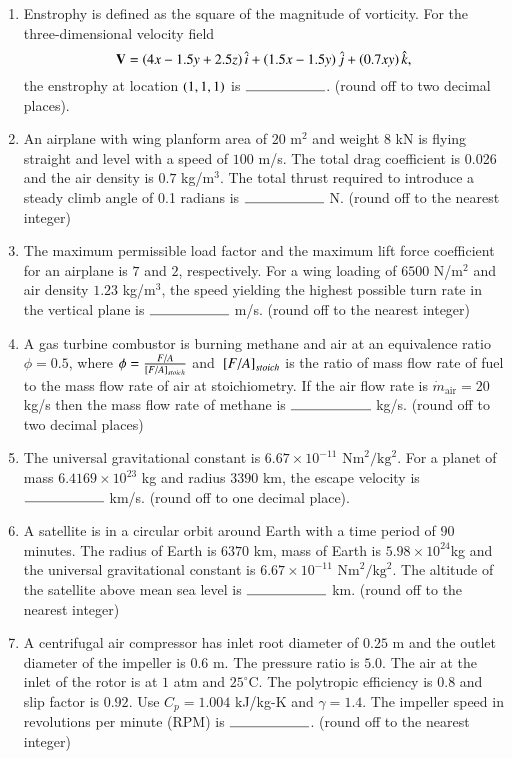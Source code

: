 \documentclass[journal,12pt,onecolumn]{IEEEtran}
\theoremstyle{remark}
\begin{document}
\begin{enumerate}[start=53]
	\item Enstrophy is defined as the square of the magnitude of vorticity. For the three-dimensional velocity field $$ \mathbf{V} = \left(4x - 1.5y + 2.5z\right)\hat{i} + \left(1.5x - 1.5y\right)\hat{j} + \left(0.7xy\right) \hat{k},$$ the enstrophy at location $\left(1, 1, 1\right)$ is $\rule{2cm}{0.4pt}$. (round off to two decimal places).

	\item An airplane with wing planform area of $20$ $\text{m}^2$ and weight $8$ kN is flying straight and level with a speed of $100$ m/s. The total drag coefficient is 0.026 and the air density is $0.7$ kg/$\text{m}^3$. The total thrust required to introduce a steady climb angle of 0.1 radians is $\rule{2cm}{0.4pt}$ N. (round off to the nearest integer)

	\item The maximum permissible load factor and the maximum lift force coefficient for an airplane is $7$ and $2$, respectively. For a wing loading of $6500$ N/$\text{m}^2$ and air density $1.23$ kg/$\text{m}^3$, the speed yielding the highest possible turn rate in the vertical plane is $\rule{2cm}{0.4pt}$ m/s. (round off to the nearest integer)

	\item A gas turbine combustor is burning methane and air at an equivalence ratio $\phi=0.5$, where $\phi=\frac{F/A}{{}\left[F/A\right]_{stoich}}$ and ${}\left[F/A\right]_{stoich}$ is the ratio of mass flow rate of fuel to the mass flow rate of air at stoichiometry. If the air flow rate is $\dot{m}_{\text{air}} = 20$ kg/s then the mass flow rate of methane is $\rule{2cm}{0.4pt}$ kg/s. (round off to two decimal places)

	\item The universal gravitational constant is $6.67\times10^{-11}$ $\text{Nm}^2/\text{kg}^2$. For a planet of mass $6.4169\times10^{23}$ kg and radius $3390$ km, the escape velocity is $\rule{2cm}{0.4pt}$ km/s. (round off to one decimal place).

	\item A satellite is in a circular orbit around Earth with a time period of $90$ minutes. The radius of Earth is $6370$ km, mass of Earth is $5.98\times10^{24}$kg and the universal gravitational constant is $6.67\times10^{-11}$ $\text{Nm}^2/\text{kg}^2$. The altitude of the satellite above mean sea level is $\rule{2cm}{0.4pt}$ km. (round off to the nearest integer)

	\item A centrifugal air compressor has inlet root diameter of $0.25$ m and the outlet diameter of the impeller is $0.6$ m. The pressure ratio is $5.0$. The air at the inlet of the rotor is at $1$ atm and $25^\circ$C. The polytropic efficiency is $0.8$ and slip factor is $0.92$. Use $C_p=1.004$ kJ/kg-K and $\gamma=1.4$. The impeller speed in revolutions per minute (RPM) is $\rule{2cm}{0.4pt}$. (round off to the nearest integer)


\end{enumerate}
\end{document}

